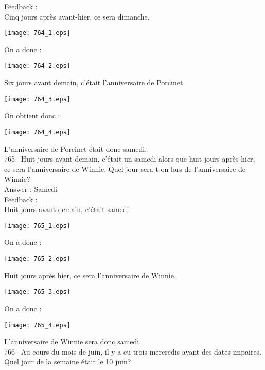 \documentclass[letterpaper, 12pt]{article}
\begin{document}
Feedback : \\
Cinq jours apr\`es avant-hier, ce sera dimanche.\\
\begin{center}
\texttt{[image: 764\_1.eps]}
\end{center}
On a donc :\\
\begin{center}
\texttt{[image: 764\_2.eps]}
\end{center}
Six jours avant demain, c'\'etait l'anniversaire de Porcinet.\\
\begin{center}
\texttt{[image: 764\_3.eps]}
\end{center}
On obtient donc :
\begin{center}
\texttt{[image: 764\_4.eps]}
\end{center}
L'anniversaire de Porcinet \'etait donc samedi.\\

765-- Huit jours avant demain, c'\'etait un samedi alors que huit jours
apr\`es hier, ce sera l'anniversaire de Winnie.  Quel jour sera-t-on lors de
l'anniversaire de Winnie?\\

Answer : Samedi\\

Feedback : \\
Huit jours avant demain, c'\'etait samedi.\\
\begin{center}
\texttt{[image: 765\_1.eps]}
\end{center}
On a donc :\\\begin{center}
\texttt{[image: 765\_2.eps]}
\end{center}
Huit jours apr\`es hier, ce sera l'anniversaire de Winnie.\\
\begin{center}
\texttt{[image: 765\_3.eps]}
\end{center}
On a donc :\\
\begin{center}
\texttt{[image: 765\_4.eps]}
\end{center}
L'anniversaire de Winnie sera donc samedi.\\

766-- Au cours du mois de juin, il y a eu trois mercredis ayant des dates
impaires.  Quel jour de la semaine \'etait le 10 juin?\\
\end{document}
